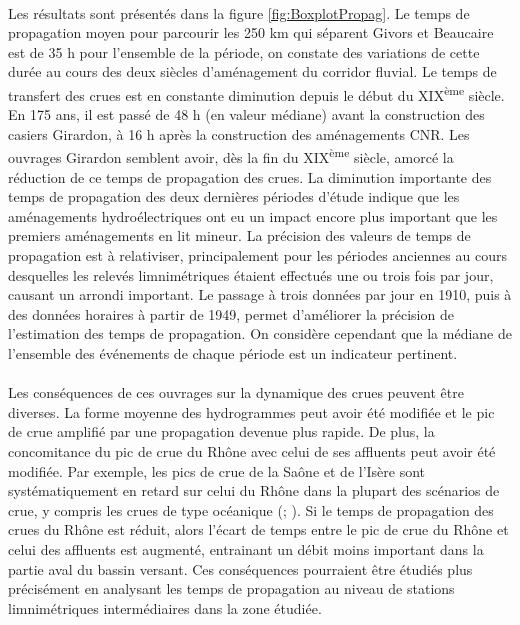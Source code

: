 \documentclass[11pt]{article}
\begin{document}
	\paragraph{} Les résultats sont présentés dans la figure \ref{fig:BoxplotPropag}. Le temps de propagation moyen pour parcourir les 250 km qui séparent Givors et Beaucaire est de 35 h pour l'ensemble de la période, on constate des variations de cette durée au cours des deux siècles d'aménagement du corridor fluvial. Le temps de transfert des crues est en constante diminution depuis le début du XIX\textsuperscript{ème} siècle. En 175 ans, il est passé de 48 h (en valeur médiane) avant la construction des casiers Girardon, à 16 h après la construction des aménagements CNR. Les ouvrages Girardon semblent avoir, dès la fin du XIX\textsuperscript{ème} siècle, amorcé la réduction de ce temps de propagation des crues. La diminution importante des temps de propagation des deux
dernières périodes d'étude indique que les aménagements hydroélectriques ont eu un impact encore plus important que les premiers aménagements en lit mineur. La précision des valeurs de temps de propagation est à relativiser, principalement pour les périodes anciennes au cours desquelles les relevés limnimétriques étaient effectués une ou trois fois par jour, causant un arrondi important. Le passage à trois données par jour en 1910, puis à des données horaires à partir de 1949, permet d'améliorer la précision de l'estimation des temps de propagation. On considère cependant que la médiane de l'ensemble des événements de chaque période est un indicateur pertinent.

	\paragraph{} Les conséquences de ces ouvrages sur la dynamique des crues peuvent être
diverses. La forme moyenne des hydrogrammes peut avoir été modifiée et le pic de crue amplifié par une propagation devenue plus rapide. De plus, la concomitance du pic de crue du Rhône avec celui de ses affluents peut avoir été modifiée. Par exemple, les pics de crue de la Saône et de l'Isère sont systématiquement en retard sur celui du Rhône dans la plupart des scénarios de crue, y compris les crues de type océanique (\citet{parde_regime_1925}; \citet{rigaudiere_etude_2000}). Si le temps de propagation des crues du Rhône est réduit, alors l'écart de temps entre le pic de crue du Rhône et celui des affluents est augmenté, entrainant un débit moins important dans la partie aval du bassin versant. Ces conséquences pourraient être étudiés plus précisément en analysant les temps de propagation au niveau de stations limnimétriques intermédiaires dans la zone étudiée.
\end{document}
